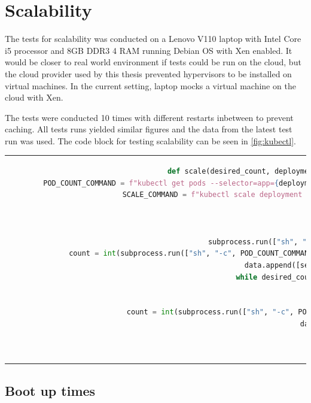 \section{Scalability}
The tests for scalability was conducted on a Lenovo V110 laptop with Intel Core i5 processor and 8GB DDR3 4 RAM running Debian OS with Xen enabled. It would be closer to real world environment if tests could be run on the cloud, but the cloud provider used by this thesis prevented hypervisors to be installed on virtual machines. In the current setting, laptop mocks a virtual machine on the cloud with Xen.

The tests were conducted 10 times with different restarts inbetween to prevent caching. All tests runs yielded similar figures and the data from the latest test run was used. The code block for testing scalability can be seen in \ref{fig:kubectl}.

\begin{code}[htpb]
  \centering
  \begin{tabular}{c}
  \begin{lstlisting}[language=Python]
    def scale(desired_count, deployment_name): # usage: result = scale("nginx",20)
        POD_COUNT_COMMAND = f"kubectl get pods --selector=app={deployment_name} | grep 'Running\|Terminating' | wc -l" # get running or terminating pods
        SCALE_COMMAND = f"kubectl scale deployment {deployment_name} --replicas {desired_count}" # scale deployment
        data = []
        second = 0
        INTERVAL = 0.5
        subprocess.run(["sh", "-c", SCALE_COMMAND]) # execute scale command
        count = int(subprocess.run(["sh", "-c", POD_COUNT_COMMAND], stdout = subprocess.PIPE).stdout.decode("utf-8")) # count number of pods
        data.append([second, count]) # save number of pods
        while desired_count != count: # continue while scaling
            time.sleep(INTERVAL)
            second += INTERVAL
            count = int(subprocess.run(["sh", "-c", POD_COUNT_COMMAND], stdout = subprocess.PIPE).stdout.decode("utf-8"))
            data.append([second, count])

        return data

\end{lstlisting}
\end{tabular}
\caption{Testing Scalability}\label{fig:kubectl}
\end{code}
\subsection{Boot up times}


